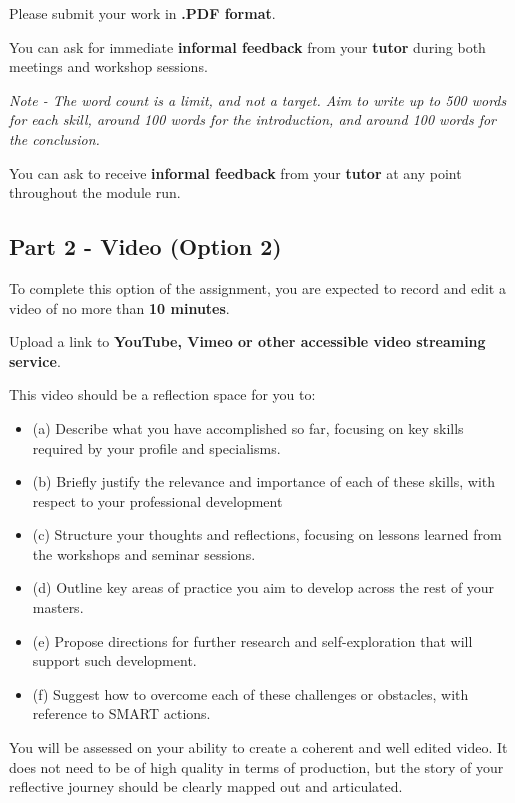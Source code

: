 \documentclass{../../fal_assignment}
\begin{document}
Please submit your work in \textbf{.PDF format}.

You can ask for immediate \textbf{informal feedback} from your \textbf{tutor} during both meetings and workshop sessions.

\emph{Note - The word count is a limit, and not a target. Aim to write up to 500 words for each skill, around 100 words for the introduction, and around 100 words for the conclusion.}

You can ask to receive \textbf{informal feedback} from your \textbf{tutor} at any point throughout the module run.



\subsection*{Part 2 - Video (Option 2)} 

To complete this option of the assignment, you are expected to record and edit a video of no more than \textbf{10 minutes}. 

Upload a link to \textbf{YouTube, Vimeo or other accessible video streaming service}.

This video should be a reflection space for you to:
\begin{itemize}
\item(a) Describe what you have accomplished so far, focusing on key skills required by your profile and specialisms.
\item (b) Briefly justify the relevance and importance of each of these skills, with respect to your professional development
\item(c) Structure your thoughts and reflections, focusing on lessons learned from the workshops and seminar sessions.
\item(d) Outline key areas of practice you aim to develop across the rest of your masters.
\item(e) Propose directions for further research and self-exploration that will support such development.
\item (f) Suggest how to overcome each of these challenges or obstacles, with reference to SMART actions.
\end{itemize}
You will be assessed on your ability to create a coherent and well edited video. It does not need to be of high quality in terms of production, but the story of your reflective journey should be clearly mapped out and articulated.
\end{document}
